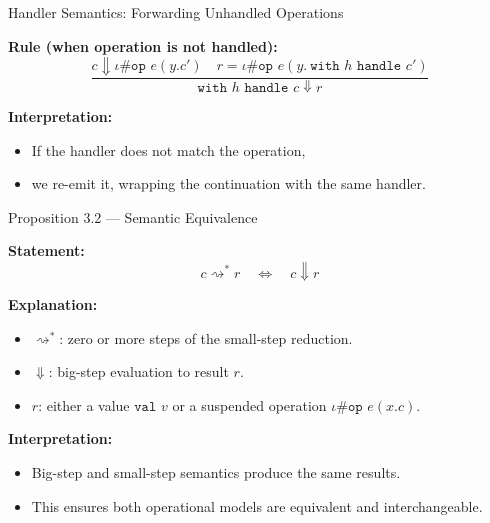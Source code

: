 \begin{frame}{Handler Semantics: Forwarding Unhandled Operations}

\textbf{Rule (when operation is not handled):}
\[
\frac{
  c \Downarrow \iota \# \texttt{op } e (y. c') \quad
  r = \iota \# \texttt{op } e (y.\ \texttt{with } h \texttt{ handle } c')
}{
  \texttt{with } h \texttt{ handle } c \Downarrow r
}
\]

\vspace{1em}
\textbf{Interpretation:}
\begin{itemize}
  \item If the handler does not match the operation,
  \item we re-emit it, wrapping the continuation with the same handler.
\end{itemize}
\end{frame}

\begin{frame}{Proposition 3.2 — Semantic Equivalence}

\textbf{Statement:}
\[
c \rightsquigarrow^{*} r \quad \Longleftrightarrow \quad c \Downarrow r
\]

\vspace{1em}
\textbf{Explanation:}
\begin{itemize}
  \item \( \rightsquigarrow^{*} \): zero or more steps of the small-step reduction.
  \item \( \Downarrow \): big-step evaluation to result \( r \).
  \item \( r \): either a value \( \texttt{val } v \) or a suspended operation \( \iota \# \texttt{op } e (x. c) \).
\end{itemize}

\vspace{1em}
\textbf{Interpretation:}
\begin{itemize}
  \item Big-step and small-step semantics produce the same results.
  \item This ensures both operational models are equivalent and interchangeable.
\end{itemize}

\end{frame}